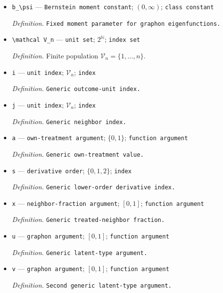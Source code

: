 \documentclass{article}
\begin{document}
\begin{itemize}
  \par\smallskip\noindent\emph{Definition.} \texttt{Fixed lower constant in the sparse-\allowbreak{}degree window.}
  \item \texttt{b\_\allowbreak{}\textbackslash{}\allowbreak{}psi} --- \texttt{Bernstein moment constant}; \((0,\infty)\); \texttt{class constant}
  \par\smallskip\noindent\emph{Definition.} \texttt{Fixed moment parameter for graphon eigenfunctions.}
  \item \texttt{\textbackslash{}\allowbreak{}mathcal V\_\allowbreak{}n} --- \texttt{unit set}; \(2^{\mathbb N}\); \texttt{index set}
  \par\smallskip\noindent\emph{Definition.} Finite population \(\mathcal V_n=\{1,\ldots,n\}\).
  \item \texttt{i} --- \texttt{unit index}; \(\mathcal V_n\); \texttt{index}
  \par\smallskip\noindent\emph{Definition.} \texttt{Generic outcome-\allowbreak{}unit index.}
  \item \texttt{j} --- \texttt{unit index}; \(\mathcal V_n\); \texttt{index}
  \par\smallskip\noindent\emph{Definition.} \texttt{Generic neighbor index.}
  \item \texttt{a} --- \texttt{own-\allowbreak{}treatment argument}; \(\{0,1\}\); \texttt{function argument}
  \par\smallskip\noindent\emph{Definition.} \texttt{Generic own-\allowbreak{}treatment value.}
  \item \texttt{s} --- \texttt{derivative order}; \(\{0,1,2\}\); \texttt{index}
  \par\smallskip\noindent\emph{Definition.} \texttt{Generic lower-\allowbreak{}order derivative index.}
  \item \texttt{x} --- \texttt{neighbor-\allowbreak{}fraction argument}; \([0,1]\); \texttt{function argument}
  \par\smallskip\noindent\emph{Definition.} \texttt{Generic treated-\allowbreak{}neighbor fraction.}
  \item \texttt{u} --- \texttt{graphon argument}; \([0,1]\); \texttt{function argument}
  \par\smallskip\noindent\emph{Definition.} \texttt{Generic latent-\allowbreak{}type argument.}
  \item \texttt{v} --- \texttt{graphon argument}; \([0,1]\); \texttt{function argument}
  \par\smallskip\noindent\emph{Definition.} \texttt{Second generic latent-\allowbreak{}type argument.}

\end{itemize}
\end{document}
